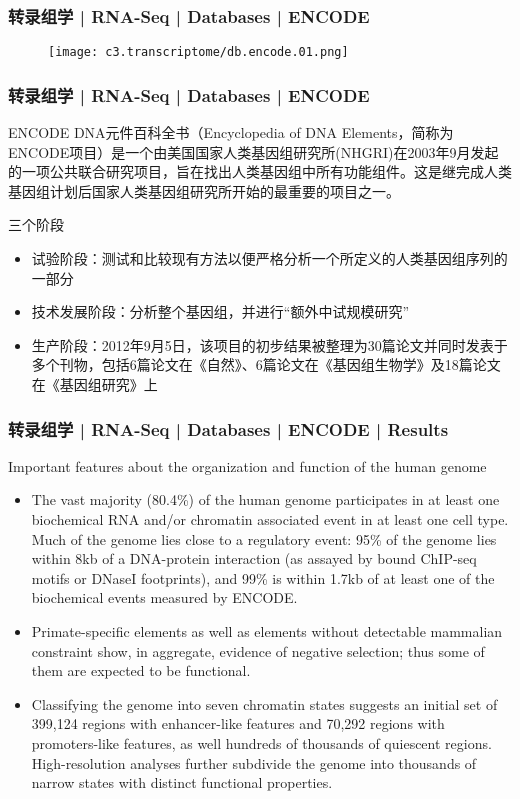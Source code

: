\begin{frame}
  \frametitle{转录组学 | RNA-Seq | Databases | ENCODE}
  \begin{figure}
    \centering
    \texttt{[image: c3.transcriptome/db.encode.01.png]}
  \end{figure}
\end{frame}

\begin{frame}
  \frametitle{转录组学 | RNA-Seq | Databases | ENCODE}
  \begin{block}{ENCODE}
 DNA元件百科全书（Encyclopedia of DNA Elements，简称为ENCODE项目）是一个由美国国家人类基因组研究所(NHGRI)在2003年9月发起的一项公共联合研究项目，旨在找出人类基因组中所有功能组件。这是继完成人类基因组计划后国家人类基因组研究所开始的最重要的项目之一。
  \end{block}
  \pause
  \begin{block}{三个阶段}
    \begin{itemize}
      \item 试验阶段：测试和比较现有方法以便严格分析一个所定义的人类基因组序列的一部分
      \item 技术发展阶段：分析整个基因组，并进行“额外中试规模研究”
      \item 生产阶段：2012年9月5日，该项目的初步结果被整理为30篇论文并同时发表于多个刊物，包括6篇论文在《自然》、6篇论文在《基因组生物学》及18篇论文在《基因组研究》上
    \end{itemize}
  \end{block}
\end{frame}

\begin{frame}
  \frametitle{转录组学 | RNA-Seq | Databases | ENCODE | Results}
  {\footnotesize
  \begin{block}{Important features about the organization and function of the human genome}
  \begin{itemize}
    \item The vast majority (80.4\%) of the human genome participates in at least one biochemical RNA and/or chromatin associated event in at least one cell type. Much of the genome lies close to a regulatory event: 95\% of the genome lies within 8kb of a DNA-protein interaction (as assayed by bound ChIP-seq motifs or DNaseI footprints), and 99\% is within 1.7kb of at least one of the biochemical events measured by ENCODE.
    \item Primate-specific elements as well as elements without detectable mammalian constraint show, in aggregate, evidence of negative selection; thus some of them are expected to be functional.
    \item Classifying the genome into seven chromatin states suggests an initial set of 399,124 regions with enhancer-like features and 70,292 regions with promoters-like features, as well hundreds of thousands of quiescent regions. High-resolution analyses further subdivide the genome into thousands of narrow states with distinct functional properties.
  \end{itemize}
  \end{block}
  }
\end{frame}

